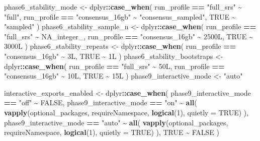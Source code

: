 \documentclass[
]{article}
\newenvironment{Shaded}{\begin{snugshade}}{\end{snugshade}}
\newcommand{\AttributeTok}[1]{\textcolor[rgb]{0.13,0.29,0.53}{#1}}
\newcommand{\ConstantTok}[1]{\textcolor[rgb]{0.56,0.35,0.01}{#1}}
\newcommand{\DataTypeTok}[1]{\textcolor[rgb]{0.13,0.29,0.53}{#1}}
\newcommand{\DecValTok}[1]{\textcolor[rgb]{0.00,0.00,0.81}{#1}}
\newcommand{\FunctionTok}[1]{\textcolor[rgb]{0.13,0.29,0.53}{\textbf{#1}}}
\newcommand{\NormalTok}[1]{#1}
\newcommand{\OtherTok}[1]{\textcolor[rgb]{0.56,0.35,0.01}{#1}}
\newcommand{\SpecialCharTok}[1]{\textcolor[rgb]{0.81,0.36,0.00}{\textbf{#1}}}
\newcommand{\StringTok}[1]{\textcolor[rgb]{0.31,0.60,0.02}{#1}}
\begin{document}
\begin{Shaded}
\begin{Highlighting}[]
\NormalTok{phase6\_stability\_mode }\OtherTok{\textless{}{-}}\NormalTok{ dplyr}\SpecialCharTok{::}\FunctionTok{case\_when}\NormalTok{(}
\NormalTok{  run\_profile }\SpecialCharTok{==} \StringTok{"full\_srs"} \SpecialCharTok{\textasciitilde{}} \StringTok{"full"}\NormalTok{,}
\NormalTok{  run\_profile }\SpecialCharTok{==} \StringTok{"consensus\_16gb"} \SpecialCharTok{\textasciitilde{}} \StringTok{"consensus\_sampled"}\NormalTok{,}
  \ConstantTok{TRUE} \SpecialCharTok{\textasciitilde{}} \StringTok{"sampled"}
\NormalTok{)}
\NormalTok{phase6\_stability\_sample\_n }\OtherTok{\textless{}{-}}\NormalTok{ dplyr}\SpecialCharTok{::}\FunctionTok{case\_when}\NormalTok{(}
\NormalTok{  run\_profile }\SpecialCharTok{==} \StringTok{"full\_srs"} \SpecialCharTok{\textasciitilde{}} \ConstantTok{NA\_integer\_}\NormalTok{,}
\NormalTok{  run\_profile }\SpecialCharTok{==} \StringTok{"consensus\_16gb"} \SpecialCharTok{\textasciitilde{}} \DecValTok{2500}\DataTypeTok{L}\NormalTok{,}
  \ConstantTok{TRUE} \SpecialCharTok{\textasciitilde{}} \DecValTok{3000}\DataTypeTok{L}
\NormalTok{)}
\NormalTok{phase6\_stability\_repeats }\OtherTok{\textless{}{-}}\NormalTok{ dplyr}\SpecialCharTok{::}\FunctionTok{case\_when}\NormalTok{(}
\NormalTok{  run\_profile }\SpecialCharTok{==} \StringTok{"consensus\_16gb"} \SpecialCharTok{\textasciitilde{}} \DecValTok{3}\DataTypeTok{L}\NormalTok{,}
  \ConstantTok{TRUE} \SpecialCharTok{\textasciitilde{}} \DecValTok{1}\DataTypeTok{L}
\NormalTok{)}
\NormalTok{phase6\_stability\_bootstraps }\OtherTok{\textless{}{-}}\NormalTok{ dplyr}\SpecialCharTok{::}\FunctionTok{case\_when}\NormalTok{(}
\NormalTok{  run\_profile }\SpecialCharTok{==} \StringTok{"full\_srs"} \SpecialCharTok{\textasciitilde{}} \DecValTok{50}\DataTypeTok{L}\NormalTok{,}
\NormalTok{  run\_profile }\SpecialCharTok{==} \StringTok{"consensus\_16gb"} \SpecialCharTok{\textasciitilde{}} \DecValTok{10}\DataTypeTok{L}\NormalTok{,}
  \ConstantTok{TRUE} \SpecialCharTok{\textasciitilde{}} \DecValTok{15}\DataTypeTok{L}
\NormalTok{)}
\NormalTok{phase9\_interactive\_mode }\OtherTok{\textless{}{-}} \StringTok{"auto"}

\NormalTok{interactive\_exports\_enabled }\OtherTok{\textless{}{-}}\NormalTok{ dplyr}\SpecialCharTok{::}\FunctionTok{case\_when}\NormalTok{(}
\NormalTok{  phase9\_interactive\_mode }\SpecialCharTok{==} \StringTok{"off"} \SpecialCharTok{\textasciitilde{}} \ConstantTok{FALSE}\NormalTok{,}
\NormalTok{  phase9\_interactive\_mode }\SpecialCharTok{==} \StringTok{"on"} \SpecialCharTok{\textasciitilde{}} \FunctionTok{all}\NormalTok{(}
    \FunctionTok{vapply}\NormalTok{(optional\_packages, requireNamespace, }\FunctionTok{logical}\NormalTok{(}\DecValTok{1}\NormalTok{), }\AttributeTok{quietly =} \ConstantTok{TRUE}\NormalTok{)}
\NormalTok{  ),}
\NormalTok{  phase9\_interactive\_mode }\SpecialCharTok{==} \StringTok{"auto"} \SpecialCharTok{\textasciitilde{}} \FunctionTok{all}\NormalTok{(}
    \FunctionTok{vapply}\NormalTok{(optional\_packages, requireNamespace, }\FunctionTok{logical}\NormalTok{(}\DecValTok{1}\NormalTok{), }\AttributeTok{quietly =} \ConstantTok{TRUE}\NormalTok{)}
\NormalTok{  ),}
  \ConstantTok{TRUE} \SpecialCharTok{\textasciitilde{}} \ConstantTok{FALSE}
\NormalTok{)}


\end{Highlighting}
\end{Shaded}
\end{document}
